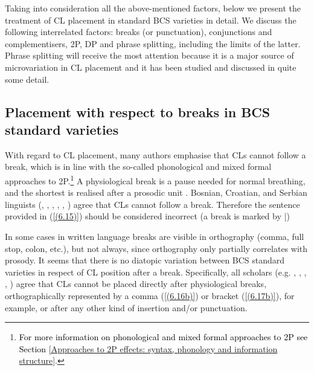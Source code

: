 Taking into consideration all the above-mentioned factors, below we present the treatment of CL placement in standard BCS varieties in detail. We discuss the following interrelated factors: breaks (or punctuation), conjunctions and complementisers, 2P, DP and phrase splitting, including the limits of the latter. Phrase splitting will receive the most attention because it is a major source of microvariation in CL placement and it has been studied and discussed in quite some detail. 

\subsection{Placement with respect to breaks in BCS standard varieties}
\label{Placement with respect to breaks in BCS standard varieties}

With regard to CL placement, many authors emphasise that CLs cannot follow a break, which is in line with the so-called phonological and mixed formal approaches to 2P.\footnote{\textcolor{black}{For more information on phonological and mixed formal approaches to 2P see Section \ref{Approaches to 2P effects: syntax, phonology and information structure}}.} A physiological break is a pause needed for normal breathing, and the shortest is realised after a prosodic unit \citep[e.g.][243]{TezakBabic96}. Bosnian, Croatian, and Serbian linguists (\citealt[cf.][246]{TezakBabic96}, \citealt[471]{JHP00}, \citealt[371]{StanojcicPopovic02}, \citealt[283, 303]{Popovic04}, \citealt[105]{PiperIvic05}, \citealt[450]{PiperKlajn14}) agree that CLs cannot follow a break. Therefore the sentence provided in (\ref{(6.15)}) should be considered incorrect (a break is marked by  |)


\noindent In some cases in written language breaks are visible in orthography (comma, full stop, colon, etc.), but not always, since orthography only partially correlates with prosody. It seems that there is no diatopic variation between BCS standard varieties in respect of CL position after a break. Specifically, all scholars (e.g. \citealt[246]{TezakBabic96}, \citealt[371]{StanojcicPopovic02}, \citealt[303]{Popovic04}, \citealt[105]{PiperIvic05}, \citealt[450]{PiperKlajn14}) agree that CLs cannot be placed directly after physiological breaks, orthographically represented by a comma (\ref{(6.16b)}) or bracket (\ref{(6.17b)}), for example, or after any other kind of insertion and/or punctuation. 

